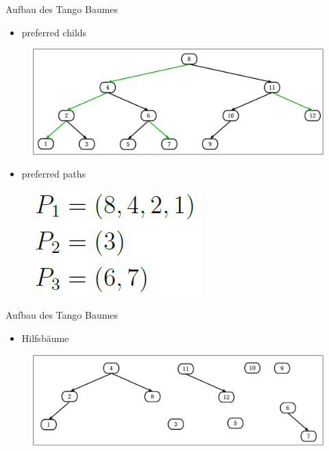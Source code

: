 \documentclass[11pt]{beamer}
\begin{document}
\begin{frame} {Aufbau des Tango Baumes}
	\begin{itemize}
		\item preferred childs
	\end{itemize}
	\begin{figure}[H]
		\centering
		\includegraphics[width=1\textwidth]{"Medien/pres/prefChilds"}
	\end{figure}
\pause
	\begin{itemize}
	\item preferred paths
\end{itemize}
\begin{figure}[H]
	\centering
	\includegraphics[height=0.2\textwidth]{"Medien/pres/prefPaths"}
\end{figure}
\end{frame}


\begin{frame} {Aufbau des Tango Baumes}
		\begin{itemize}
		\item Hilfsbäume
	\end{itemize}
	\begin{figure}[H]
		\centering
		\includegraphics[width=1\textwidth]{"Medien/pres/Hilfsbaeume"}
	\end{figure}
\end{frame}
\end{document}
